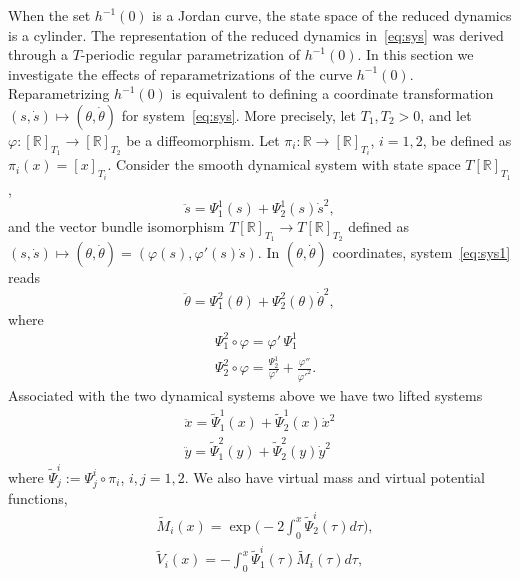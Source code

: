 When the set $h^{-1}(0)$ is a Jordan curve, the state space of the
reduced dynamics is a cylinder. The representation of the reduced
dynamics in~\eqref{eq:sys} was derived through a $T$-periodic regular
parametrization of $h^{-1}(0)$. In this section we investigate the
effects of reparametrizations of the curve $h^{-1}(0)$.
Reparametrizing $h^{-1}(0)$ is equivalent to defining a coordinate
transformation $(s,\dot s) \mapsto (\theta,\dot\theta)$ for
system~\eqref{eq:sys}. More precisely, let $T_1, T_2>0$, and let
$\varphi : [\mathbb{R}]_{T_1} \to [\mathbb{R}]_{T_2}$ be a diffeomorphism.  Let
$\pi_i : \mathbb{R} \to [\mathbb{R}]_{T_i}$, $i=1,2$, be defined as $\pi_i(x) =
[x]_{T_i}$.  Consider the smooth dynamical system with state space $T
[\mathbb{R}]_{T_1}$,
\begin{equation}
\label{eq:sys1}
\ddot s = \Psi^1_1(s) + \Psi^1_2(s) \dot s^2,
\end{equation}
and the vector bundle isomorphism $T [\mathbb{R}]_{T_1} \to T [\mathbb{R}]_{T_2}$ defined as
$(s,\dot s) \mapsto (\theta,\dot \theta) = (\varphi(s),\varphi'(s)
\dot s)$. In $(\theta,\dot \theta)$ coordinates, system~\eqref{eq:sys1}
reads
\begin{equation}
\label{eq:sys2}
\ddot \theta = \Psi^2_1(\theta) + \Psi^2_2(\theta) \dot \theta^2,
\end{equation}
where
\[
\begin{aligned}
& \Psi^2_1\circ \varphi  = \varphi' \, \Psi_1^1 \\
& \Psi^2_2\circ \varphi = \frac{\Psi_2^1}{\varphi'} +
\frac{\varphi''}{\varphi'^2}.
\end{aligned}
\]
Associated with the two dynamical systems above we have two lifted systems
\begin{align} 
\label{eq:lifted:sys1}
\ddot x = \tilde \Psi_1^1(x) + \tilde \Psi_2^1(x) \dot x^2 \\
\label{eq:lifted:sys2}
\ddot y = \tilde \Psi_1^2(y) + \tilde \Psi_2^2(y) \dot y^2 
\end{align}
where $\tilde \Psi^i_j := \Psi^i_j \circ \pi_i$, $i,j=1,2$. We also
have virtual mass and virtual potential functions,
\begin{equation}\label{eq:VandM_transformed}
\begin{aligned}
&\tilde M_i(x) = \exp \Big( -2 \int_0^x \tilde \Psi^i_2(\tau) d \tau
\Big),\\
&\tilde V_i(x) = -\int_0^x \tilde \Psi^i_1(\tau) \tilde M_i(\tau) d
\tau,
\end{aligned}
\end{equation}
